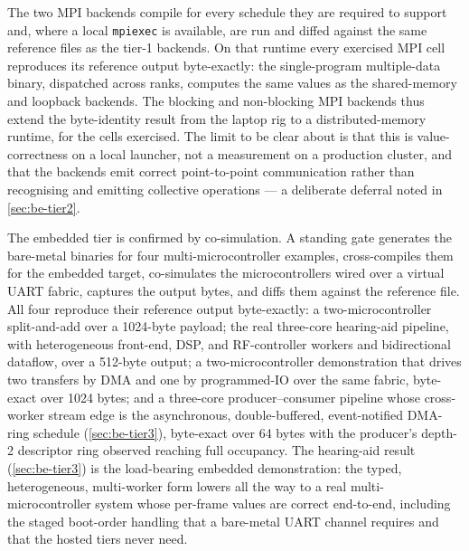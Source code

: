 The two MPI backends compile for every schedule they are required to support and,
where a local \texttt{mpiexec} is available, are run and diffed against the same
reference files as the tier-1 backends. On that runtime every exercised MPI cell
reproduces its reference output byte-exactly: the single-program multiple-data
binary, dispatched across ranks, computes the same values as the shared-memory and
loopback backends. The blocking and non-blocking MPI backends thus extend the
byte-identity result from the laptop rig to a distributed-memory runtime, for the
cells exercised. The limit to be clear about is that this is value-correctness on a local
launcher, not a measurement on a production cluster, and that the backends emit
correct point-to-point communication rather than recognising and emitting
collective operations --- a deliberate deferral noted in \cref{sec:be-tier2}.

The embedded tier is confirmed by co-simulation. A standing gate generates the
bare-metal binaries for four multi-microcontroller examples, cross-compiles them
for the embedded target, co-simulates the microcontrollers wired over a virtual
UART fabric, captures the output bytes, and diffs them against the reference file.
All four reproduce their reference output byte-exactly: a two-microcontroller
split-and-add over a 1024-byte payload; the real three-core hearing-aid pipeline,
with heterogeneous front-end, DSP, and RF-controller workers and bidirectional
dataflow, over a 512-byte output; a two-microcontroller demonstration that
drives two transfers by DMA and one by programmed-IO over the same fabric,
byte-exact over 1024 bytes; and a three-core producer--consumer pipeline whose
cross-worker stream edge is the asynchronous, double-buffered, event-notified DMA-ring
schedule (\cref{sec:be-tier3}), byte-exact over 64 bytes with the producer's depth-2
descriptor ring observed reaching full occupancy. The hearing-aid result (\cref{sec:be-tier3}) is
the load-bearing embedded demonstration: the typed, heterogeneous, multi-worker form
lowers all the way to a real multi-microcontroller system whose per-frame values are
correct end-to-end, including the staged boot-order handling that a bare-metal UART channel
requires and that the hosted tiers never need.

